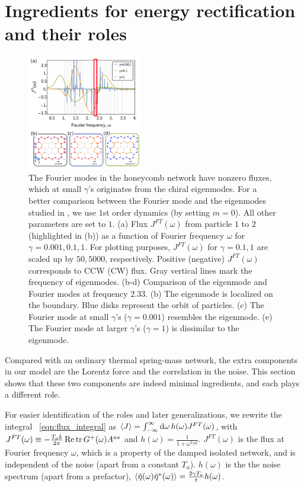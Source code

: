 \documentclass[
 preprint,
 preprintnumbers,
 amsmath,amssymb,
 aps,
 pre,
 longbibliography,
 10pt, twocolumn
]{revtex4-1}
\begin{document}
\section{Ingredients for energy rectification and their roles} \label{sec:fourier}

\begin{figure}[ht]
	\centering
	\includegraphics[width=0.45\textwidth]{2_Fourier_modes.pdf}
    \caption{The Fourier modes in the honeycomb network have nonzero fluxes, which at small $\gamma$'s originates from the chiral eigenmodes. For a better comparison between the Fourier mode and the eigenmodes studied in \cite{Nash2015TopologicalMetamaterials}, we use $1$st order dynamics (by setting $m=0$). All other parameters are set to $1$. 
    (a) Flux $J^{FT}(\omega)$ from particle $1$ to $2$ (highlighted in (b)) as a function of Fourier frequency $\omega$ for $\gamma=0.001,0.1,1$. For plotting purposes, $J^{FT}(\omega)$ for $\gamma=0.1,1$ are scaled up by $50,5000$, respectively. Positive (negative) $J^{FT}(\omega)$ corresponds to CCW (CW) flux. Gray vertical lines mark the frequency of eigenmodes. 
    (b-d) Comparison of the eigenmode and Fourier modes at frequency $2.33$.
    (b) The eigenmode is localized on the boundary. Blue disks represent the orbit of particles. 
    (c) The Fourier mode at small $\gamma$'s ($\gamma=0.001$) resembles the eigenmode.
    (e) The Fourier mode at larger $\gamma$'s ($\gamma=1$) is dissimilar to the eigenmode.
    }
    \label{fig:Fourier_modes}
\end{figure}

Compared with an ordinary thermal spring-mass network, the extra components in our model are the Lorentz force and the correlation in the noise. 
This section shows that these two components are indeed minimal ingredients, and each plays a different role.

For easier identification of the roles and later generalizations, we rewrite the integral \eqnname~\eqref{eqn:flux_integral} as $\expval{J} = \int_{-\infty}^\infty \dd{\omega} h(\omega) J^{FT}(\omega)$, with $J^{FT}(\omega) \equiv -\frac{T_a k}{2\pi} \Re \tr G^+(\omega)A^{as}$ and $h(\omega)=\frac{1}{1+\omega^2\tau^2}$. $J^{FT}(\omega)$ is the flux at Fourier frequency $\omega$, which is a property of the damped isolated network, and is independent of the noise (apart from a constant $T_a$). 
$h(\omega)$ is the the noise spectrum (apart from a prefactor), $\expval{\tilde{\eta}(\omega)\tilde{\eta}^*(\omega)} = \frac{2\gamma T_a}{t}h(\omega)$. 
\end{document}
